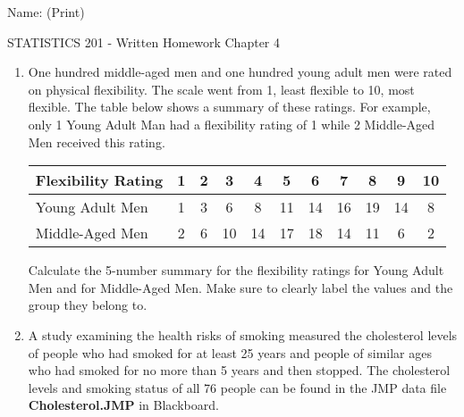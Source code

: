 \documentclass{article}
\begin{document}
\hspace{2.5in} Name: (Print) \underline{\mbox{\hspace{3in}}}\\

\begin{center}
{\large STATISTICS 201 - Written Homework Chapter 4}\\[3mm]
\end{center}

\begin{enumerate}

\item One hundred middle-aged men and one hundred young adult men were rated on physical flexibility.  The scale went from 1, least flexible to 10, most flexible.  The table below shows a summary of these ratings.  For example, only 1 Young Adult Man had a flexibility rating of 1 while 2 Middle-Aged Men received this rating.

\begin{center}
\begin{tabular}{l|cccccccccc} \hline
Flexibility Rating & 1 & 2 & 3 & 4 & 5 & 6 & 7 & 8 & 9 & 10\\ \hline
Young Adult Men & 1 & 3 & 6 & 8 & 11 & 14 & 16 & 19 & 14 & 8\\
Middle-Aged Men & 2 & 6 & 10 & 14 & 17 & 18 & 14 & 11 & 6 & 2\\ \hline
\end{tabular}
\end{center}

Calculate the 5-number summary for the flexibility ratings for Young Adult Men and for Middle-Aged Men.  Make sure to clearly label the values and the group they belong to.

\newpage

\item A study examining the health risks of smoking measured the cholesterol levels of people who had smoked for at least 25 years and people of similar ages who had smoked for no more than 5 years and then stopped.  The cholesterol levels and smoking status of all 76 people can be found in the JMP data file {\bf Cholesterol.JMP}  in Blackboard.


\end{enumerate}
\end{document}
